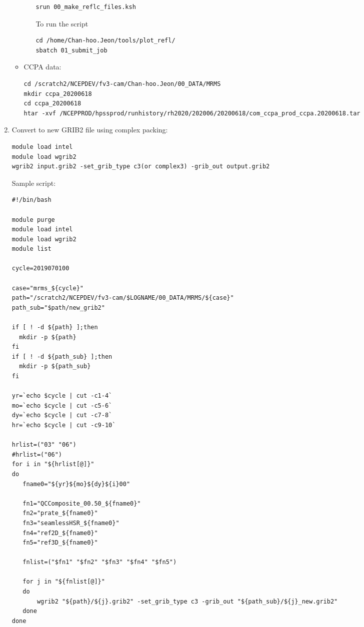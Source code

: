 \documentclass[11pt,fleqn]{report}              %
\begin{document}
\begin{enumerate}
\begin{itemize}
\begin{enumerate}
\begin{lstlisting}[frame=trBL, basicstyle=\tiny]
srun 00_make_reflc_files.ksh
\end{lstlisting}

To run the script
\lstset{language=bash}   
\begin{lstlisting}[frame=trBL]
cd /home/Chan-hoo.Jeon/tools/plot_refl/
sbatch 01_submit_job
\end{lstlisting}

\end{enumerate}



\item CCPA data:
\lstset{language=bash}   
\begin{lstlisting}[frame=trBL]
cd /scratch2/NCEPDEV/fv3-cam/Chan-hoo.Jeon/00_DATA/MRMS
mkdir ccpa_20200618
cd ccpa_20200618
htar -xvf /NCEPPROD/hpssprod/runhistory/rh2020/202006/20200618/com_ccpa_prod_ccpa.20200618.tar
\end{lstlisting}
\end{itemize}

\item Convert to new GRIB2 file using complex packing:
\lstset{language=bash}   
\begin{lstlisting}[frame=trBL]
module load intel
module load wgrib2
wgrib2 input.grib2 -set_grib_type c3(or complex3) -grib_out output.grib2
\end{lstlisting}

Sample script:
\lstset{language=bash}   
\begin{lstlisting}[frame=trBL, basicstyle=\tiny]
#!/bin/bash

module purge
module load intel
module load wgrib2
module list

cycle=2019070100

case="mrms_${cycle}"
path="/scratch2/NCEPDEV/fv3-cam/$LOGNAME/00_DATA/MRMS/${case}"
path_sub="$path/new_grib2"

if [ ! -d ${path} ];then
  mkdir -p ${path}
fi
if [ ! -d ${path_sub} ];then
  mkdir -p ${path_sub}
fi

yr=`echo $cycle | cut -c1-4`
mo=`echo $cycle | cut -c5-6`
dy=`echo $cycle | cut -c7-8`
hr=`echo $cycle | cut -c9-10`

hrlist=("03" "06")
#hrlist=("06")
for i in "${hrlist[@]}"
do
   fname0="${yr}${mo}${dy}${i}00"

   fn1="QCComposite_00.50_${fname0}"
   fn2="prate_${fname0}"
   fn3="seamlessHSR_${fname0}"
   fn4="ref2D_${fname0}"
   fn5="ref3D_${fname0}"

   fnlist=("$fn1" "$fn2" "$fn3" "$fn4" "$fn5")

   for j in "${fnlist[@]}"
   do
       wgrib2 "${path}/${j}.grib2" -set_grib_type c3 -grib_out "${path_sub}/${j}_new.grib2"
   done
done

\end{lstlisting}


\end{enumerate}
\end{document}
